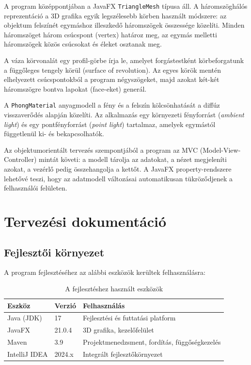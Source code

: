 \documentclass[12pt,a4paper]{article}
\newcommand{\code}[1]{\texttt{#1}}
\begin{document}
A program középpontjában a JavaFX \code{TriangleMesh} típusa áll. A háromszöghálós
reprezentáció a 3D grafika egyik legszélesebb körben használt módszere: az objektum
felszínét egymáshoz illeszkedő háromszögek összessége közelíti. Minden háromszöget három
csúcspont (vertex) határoz meg, az egymás melletti háromszögek közös csúcsokat és éleket
osztanak meg.

A váza körvonalát egy profil-görbe írja le, amelyet forgástestként körbeforgatunk a
függőleges tengely körül (surface of revolution). Az egyes körök mentén elhelyezett
csúcspontokból a program négyszögeket, majd azokat két-két háromszögre bontva lapokat
(face-eket) generál.

A \code{PhongMaterial} anyagmodell a fény és a felszín kölcsönhatását a diffúz
visszaverődés alapján közelíti. Az alkalmazás egy környezeti fényforrást
(\textit{ambient light}) és egy pontfényforrást (\textit{point light}) tartalmaz,
amelyek egymástól függetlenül ki- és bekapcsolhatók.

Az objektumorientált tervezés szempontjából a program az MVC (Model-View-Controller)
mintát követi: a modell tárolja az adatokat, a nézet megjeleníti azokat, a vezérlő
pedig összehangolja a kettőt. A JavaFX property-rendszere lehetővé teszi, hogy az
adatmodell változásai automatikusan tükröződjenek a felhasználói felületen.

\section{Tervezési dokumentáció}

\subsection{Fejlesztői környezet}

A program fejlesztéséhez az alábbi eszközök kerültek felhasználásra:

\begin{table}[H]
  \centering
  \begin{tabularx}{\textwidth}{llX}
    \toprule
    \textbf{Eszköz}   & \textbf{Verzió} & \textbf{Felhasználás}                          \\
    \midrule
    Java (JDK)        & 17              & Fejlesztési és futtatási platform               \\
    JavaFX            & 21.0.4          & 3D grafika, kezelőfelület                       \\
    Maven             & 3.9             & Projektmenedzsment, fordítás, függőségkezelés   \\
    IntelliJ IDEA     & 2024.x          & Integrált fejlesztőkörnyezet                    \\
    \bottomrule
  \end{tabularx}
  \caption{A fejlesztéshez használt eszközök}
\end{table}
\end{document}
